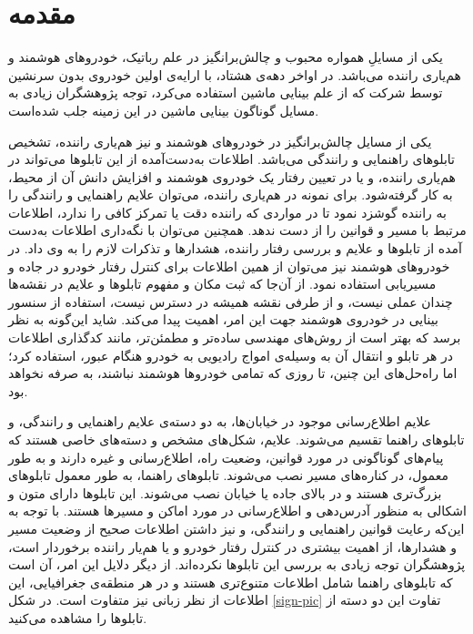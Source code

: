 \documentclass[12pt,a4paper]{article}
\newcommand{\nocontentsline}[3]{}
\newcommand{\tocless}[2]{\bgroup\let\addcontentsline=\nocontentsline#1{#2}\egroup}
\theoremstyle{definition}
\theoremstyle{theorem}
\theoremstyle{definition}
\begin{document}
\newpage
\tocless\tableofcontents
\newpage 
{}
\section{مقدمه}
یکی از مسایلِ همواره محبوب و چالش‌برانگیز در علم رباتیک، خودروهای هوشمند و هم‌یاری راننده می‌باشد. در اواخر دهه‌ی هشتاد، با ارایه‌ی اولین خودروی بدون سرنشین توسط شرکت  که از علم بینایی ماشین استفاده می‌کرد\cite{benz}، توجه پژوهشگران زیادی به مسایل گوناگون بینایی ماشین در این زمینه جلب شده‌است. 

یکی از مسایل چالش‌برانگیز در خودروهای هوشمند و نیز هم‌یاری راننده‌، تشخیص تابلوهای راهنمایی و رانندگی می‌باشد. اطلاعات به‌دست‌آمده از این تابلوها می‌تواند در هم‌یاری راننده، و یا در تعیین رفتار یک خودروی هوشمند و افزایش دانش آن از محیط، به‌ کار گرفته‌شود. برای نمونه در هم‌یاری راننده، می‌توان علایم راهنمایی و رانندگی را به راننده گوشزد نمود تا در مواردی که راننده دقت یا تمرکز کافی را ندارد، اطلاعات مرتبط با مسیر و قوانین را از دست ندهد. همچنین می‌توان با نگه‌داری اطلاعات به‌دست آمده از تابلوها و علایم و بررسی رفتار راننده، هشدارها و تذکرات لازم را به وی داد. در خودروهای هوشمند نیز می‌توان از همین اطلاعات برای کنترل رفتار خودرو در جاده و مسیریابی استفاده نمود. از آن‌جا که ثبت مکان و مفهوم تابلوها و علایم در نقشه‌ها چندان عملی نیست، و از طرفی نقشه همیشه در دسترس نیست، استفاده از سنسور بینایی در خودروی هوشمند جهت این امر، اهمیت پیدا می‌کند. شاید این‌گونه به نظر برسد که بهتر است از روش‌های مهندسی ساده‌تر و مطمئن‌تر، مانند کدگذاری اطلاعات در هر تابلو و انتقال آن به وسیله‌ی امواج رادیویی به خودرو هنگام عبور، استفاده کرد؛ اما راه‌حل‌های این چنین، تا روزی که تمامی خودروها هوشمند نباشند، به صرفه نخواهد بود. 


علایم اطلاع‌رسانی موجود در خیابان‌ها، به دو دسته‌ی علایم راهنمایی و رانندگی، و تابلوهای راهنما تقسیم می‌شوند. علایم، شکل‌های مشخص و دسته‌های خاصی هستند که پیام‌های گوناگونی در مورد قوانین، وضعیت راه، اطلاع‌رسانی‌ و غیره دارند و به طور معمول، در کناره‌های مسیر نصب می‌شوند. تابلوهای راهنما، به طور معمول تابلوهای بزرگ‌تری هستند و در بالای جاده یا خیابان نصب می‌شوند. این تابلوها دارای متون و اشکالی به منظور آدرس‌دهی و اطلاع‌رسانی در مورد اماکن و مسیرها هستند. با توجه به این‌که رعایت قوانین راهنمایی و رانندگی، و نیز داشتن اطلاعات صحیح از وضعیت مسیر و هشدارها، از اهمیت بیشتری در کنترل رفتار خودرو و یا هم‌یار راننده برخوردار است، پژوهشگران توجه زیادی به بررسی این تابلوها نکرده‌اند. از دیگر دلایل این امر، آن است که تابلوهای راهنما شامل اطلاعات متنوع‌تری هستند و در هر منطقه‌ی جغرافیایی، این اطلاعات از نظر زبانی نیز متفاوت است\cite{gonzalez1}. در شکل \ref{sign-pic} تفاوت این دو دسته از تابلوها را مشاهده می‌کنید.
\end{document}
